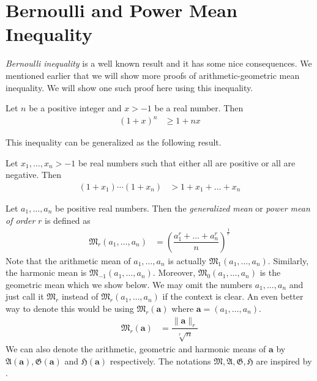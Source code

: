 \documentclass{subfile}
\begin{document}
	\section{Bernoulli and Power Mean Inequality}\label{sec:powermean}
	\emph{Bernoulli inequality} is a well known result and it has some nice consequences. We mentioned earlier that we will show more proofs of arithmetic-geometric mean inequality. We will show one such proof here using this inequality.
		\begin{theorem}
			Let $n$ be a positive integer and $x>-1$ be a real number. Then
				\begin{align*}
					(1+x)^{n}
						& \geq1+nx
				\end{align*}
		\end{theorem}
	This inequality can be generalized as the following result.
		\begin{theorem}
			Let $x_{1},\ldots,x_{n}>-1$ be real numbers such that either all are positive or all are negative. Then
				\begin{align*}
					(1+x_{1})\cdots(1+x_{n})
						& > 1+x_{1}+\ldots+x_{n}
				\end{align*}
		\end{theorem}%
	
			Let $a_{1},\ldots,a_{n}$ be positive real numbers. Then the \emph{generalized mean} or \emph{power mean of order} $r$ is defined as
				\begin{align*}
					\mathfrak{M}_{r}(a_{1},\ldots,a_{n})
						& = \left(\dfrac{a_{1}^{r}+\ldots+a_{n}^{r}}{n}\right)^{\frac{1}{r}}
				\end{align*}
			Note that the arithmetic mean of $a_{1},\ldots,a_{n}$ is actually $\mathfrak{M}_{1}(a_{1},\ldots,a_{n})$. Similarly, the harmonic mean is $\mathfrak{M}_{-1}(a_{1},\ldots,a_{n})$. Moreover, $\mathfrak{M}_0(a_{1},\ldots,a_{n})$ is the geometric mean which we show below.
	We may omit the numbers $a_{1},\ldots,a_{n}$ and just call it $\mathfrak{M}_{r}$ instead of $\mathfrak{M}_{r}(a_{1},\ldots,a_{n})$ if the context is clear. An even better way to denote this would be using $\mathfrak{M}_{r}(\mathbf{a})$ where $\mathbf{a}=(a_{1},\ldots,a_{n})$.
		\begin{align*}
			\mathfrak{M}_{r}(\mathbf{a})
				& = \dfrac{\|\mathbf{a}\|_{r}}{\sqrt[r]{n}}
		\end{align*}
	We can also denote the arithmetic, geometric and harmonic means of $\mathbf{a}$ by $\mathfrak{A}(\mathbf{a}),\mathfrak{G}(\mathbf{a})$ and $\mathfrak{H}(\mathbf{a})$ respectively. The notations $\mathfrak{M},\mathfrak{A},\mathfrak{G},\mathfrak{H}$ are inspired by \textcite{hardy_littlewood_polya_1934}. 
	
\end{document}
